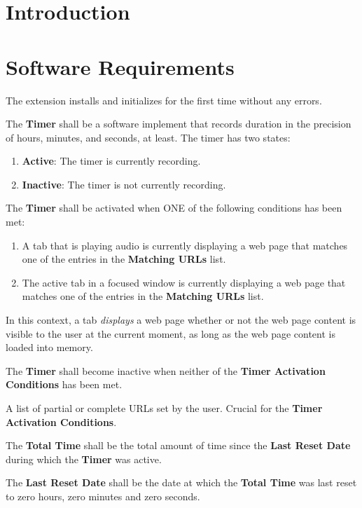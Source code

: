 \documentclass{designdoc}
\begin{document}
\section{Introduction}

\section{Software Requirements}
The extension installs and initializes for the first time without any errors.

The \textbf{Timer} shall be a software implement that records duration in the
precision of hours, minutes, and seconds, at least. The timer has two states:
\begin{enumerate}
\item \textbf{Active}: The timer is currently recording.
\item \textbf{Inactive}: The timer is not currently recording.
\end{enumerate}

The \textbf{Timer} shall be activated when ONE of the following conditions has
been met:
\begin{enumerate}
\item A tab that is playing audio is currently displaying a web page that
  matches one of the entries in the \textbf{Matching URLs} list.
\item The active tab in a focused window is currently displaying a web page
  that matches one of the entries in the \textbf{Matching URLs} list.
\end{enumerate}
In this context, a tab \textit{displays} a web page whether or not the web page
content is visible to the user at the current moment, as long as the web page
content is loaded into memory.

The \textbf{Timer} shall become inactive when neither of the \textbf{Timer
  Activation Conditions} has been met.

A list of partial or complete URLs set by the user. Crucial for the
\textbf{Timer Activation Conditions}.

The \textbf{Total Time} shall be the total amount of time since the
\textbf{Last Reset Date} during which the \textbf{Timer} was active.

The \textbf{Last Reset Date} shall be the date at which the \textbf{Total Time}
was last reset to zero hours, zero minutes and zero seconds.
\end{document}
